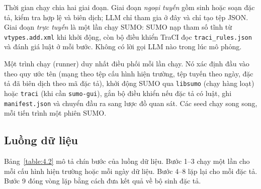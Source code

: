 \documentclass[../main.tex]{subfiles}
\begin{document}
Thời gian chạy chia hai giai đoạn. Giai đoạn \emph{ngoại tuyến} gồm sinh hoặc soạn đặc tả, kiểm tra hợp lệ và biên dịch; LLM chỉ tham gia ở đây và chỉ tạo tệp JSON. Giai đoạn \emph{trực tuyến} là một lần chạy SUMO: SUMO nạp tham số tĩnh từ \texttt{vtypes.add.xml} khi khởi động, còn bộ điều khiển TraCI đọc \texttt{traci\_rules.json} và đánh giá luật ở mỗi bước. Không có lời gọi LLM nào trong lúc mô phỏng.

Một trình chạy (runner) duy nhất điều phối mỗi lần chạy. Nó xác định đầu vào theo quy ước tên (mạng theo tệp cấu hình hiện trường, tệp tuyến theo ngày, đặc tả đã biên dịch theo mã đặc tả), khởi động SUMO qua \texttt{libsumo} (chạy hàng loạt) hoặc \texttt{traci} (khi cần \texttt{sumo-gui}), gắn bộ điều khiển nếu đặc tả có luật, ghi \texttt{manifest.json} và chuyển đầu ra sang lược đồ quan sát. Các seed chạy song song, mỗi tiến trình một phiên SUMO.

\subsection{Luồng dữ liệu}

Bảng~\ref{table:4.2} mô tả chín bước của luồng dữ liệu. Bước 1--3 chạy một lần cho mỗi cấu hình hiện trường hoặc mỗi ngày dữ liệu. Bước 4--8 lặp lại cho mỗi đặc tả. Bước 9 đóng vòng lặp bằng cách đưa kết quả về bộ sinh đặc tả.
\end{document}
